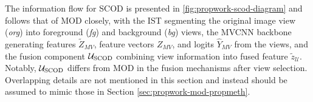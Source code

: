 The information flow for SCOD is presented in \ref{fig:propwork-scod-diagram} and follows that of MOD closely, with the IST segmenting the original image view (\textit{org}) into foreground (\textit{fg}) and background (\textit{bg}) views, the MVCNN backbone generating features $\tilde{Z}_{MV}$, feature vectors $Z_{MV}$, and logits $\hat{Y}_{MV}$ from the views, and the fusion component $\mathcal{U}_{\text{SCOD}}$ combining view information into fused feature $\tilde{z}_{\mathcal{U}}$. Notably, $\mathcal{U}_{\text{SCOD}}$ differs from MOD in the fusion mechanisms after view selection. Overlapping details are not mentioned in this section and instead should be assumed to mimic those in Section \ref{sec:propwork-mod-propmeth}.

